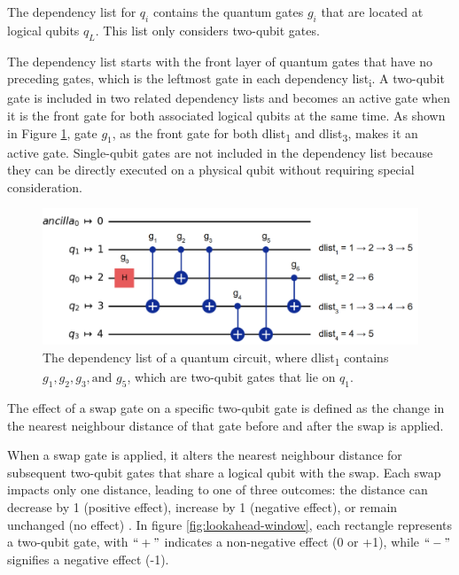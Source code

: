 \begin{definition} %
    The dependency list for $q_i$ contains the quantum gates $g_i$ that are located at logical qubits $q_L$. This list only considers two-qubit gates.
\end{definition}
The dependency list starts with the front layer of quantum gates that have no preceding gates, which is the leftmost gate in each dependency list\textsubscript{i}. A two-qubit gate is included in two related dependency lists and becomes an active gate when it is the front gate for both associated logical qubits at the same time. As shown in Figure \ref{fig:dependency-list}, gate $g_1$, as the front gate for both dlist\textsubscript{1} and dlist\textsubscript{3}, makes it an active gate. Single-qubit gates are not included in the dependency list because they can be directly executed on a physical qubit without requiring special consideration.
\begin{figure}[htbp]
    \centering
    \includegraphics[width=0.7\linewidth]{image/dependency_list.png}
    \caption{The dependency list of a quantum circuit, where dlist\textsubscript{1} contains $g_1, g_2, g_3, \text{and } g_5$, which are two-qubit gates that lie on $q_1$.}
    \label{fig:dependency-list}
\end{figure}

\begin{definition} %
    The effect of a swap gate on a specific two-qubit gate is defined as the change in the nearest neighbour distance of that gate before and after the swap is applied.
\end{definition}
When a swap gate is applied, it alters the nearest neighbour distance for subsequent two-qubit gates that share a logical qubit with the swap. Each swap impacts only one distance, leading to one of three outcomes: the distance can decrease by 1 (positive effect), increase by 1 (negative effect), or remain unchanged (no effect) \cite{zhu_dynamic_2020}. In figure \ref{fig:lookahead-window}, each rectangle represents a two-qubit gate, with $``+"$ indicates a non-negative effect (0 or +1), while $``-"$ signifies a negative effect (-1).


